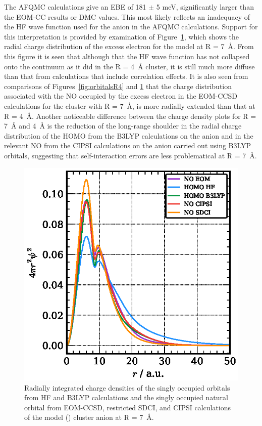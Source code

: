 The AFQMC calculations give an EBE of 181 $\pm$ 5 meV, significantly larger than the EOM-CC results or DMC values.
This most likely reflects an inadequacy of the HF wave function used for the anion in the AFQMC calculations.
Support for this interpretation is provided by examination of Figure~\ref{fig:orbitalsR7}, which shows the radial charge distribution of the excess electron for the  model at R = \SI{7}{\angstrom}.
From this figure it is seen that although that the HF wave function has not collapsed onto the continuum as it did in the R = \SI{4}{\angstrom} cluster, it is still much more diffuse than that from calculations that include correlation effects. It is also seen from comparisons of Figures~\ref{fig:orbitalsR4} and \ref{fig:orbitalsR7} that the charge distribution associated with the NO occupied by the excess electron in the EOM-CCSD calculations for the cluster with R = \SI{7}{\angstrom}, is more radially extended than that at R = \SI{4}{\angstrom}.
Another noticeable difference between the charge density plots for R = \SI{7}{\angstrom} and \SI{4}{\angstrom} is the reduction of the long-range shoulder in the radial charge distribution of the HOMO from the B3LYP calculations on the anion and in the relevant NO from the CIPSI calculations on the anion carried out using B3LYP orbitals, suggesting that self-interaction errors are less problematical at R = \SI{7}{\angstrom}.

 
\begin{figure}
    \includegraphics[width=\columnwidth,keepaspectratio]{Images/chapter3/r7_orbitalr2.eps}
    \caption{\label{fig:orbitalsR7} Radially integrated charge densities of the singly occupied orbitals from HF and B3LYP calculations and the singly occupied natural orbital from EOM-CCSD, restricted SDCI, and CIPSI calculations  of the model () cluster anion at R = \SI{7}{\angstrom}.}
\end{figure}

